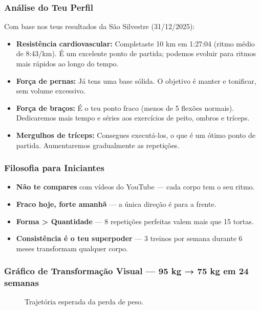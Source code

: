 \documentclass[12pt,a4paper]{scrartcl}
\begin{document}
\subsubsection{Análise do Teu Perfil}
Com base nos teus resultados da São Silvestre (31/12/2025):
\begin{itemize}
    \item \textbf{Resistência cardiovascular:} Completaste 10 km em 1:27:04 (ritmo médio de 8:43/km). É um excelente ponto de partida; podemos evoluir para ritmos mais rápidos ao longo do tempo.
    \item \textbf{Força de pernas:} Já tens uma base sólida. O objetivo é manter e tonificar, sem volume excessivo.
    \item \textbf{Força de braços:} É o teu ponto fraco (menos de 5 flexões normais). Dedicaremos mais tempo e séries aos exercícios de peito, ombros e tríceps.
    \item \textbf{Mergulhos de tríceps:} Consegues executá-los, o que é um ótimo ponto de partida. Aumentaremos gradualmente as repetições.
\end{itemize}

\subsubsection{Filosofia para Iniciantes}
\begin{itemize}
    \item \textbf{Não te compares} com vídeos do YouTube — cada corpo tem o seu ritmo.
    \item \textbf{Fraco hoje, forte amanhã} — a única direção é para a frente.
    \item \textbf{Forma > Quantidade} — 8 repetições perfeitas valem mais que 15 tortas.
    \item \textbf{Consistência é o teu superpoder} — 3 treinos por semana durante 6 meses transformam qualquer corpo.
\end{itemize}

\subsubsection{Gráfico de Transformação Visual — 95 kg → 75 kg em 24 semanas}
\begin{figure}[h]
\centering
{}
\caption{Trajetória esperada da perda de peso.}
\end{figure}
\end{document}
